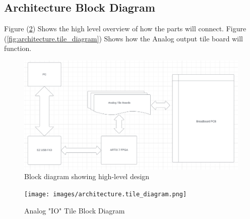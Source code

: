 \subsection{Architecture Block Diagram}
	Figure (\ref{fig:architecture.block_diagram}) Shows the high level overview of how the parts will connect. Figure (\ref{fig:architecture.tile_diagram}) Shows how the Analog output tile board will function.

	\begin{figure}[H]
		\centering
		\includegraphics[width=0.8\linewidth]{images/architecture.block_diagram.png}
		\caption{Block diagram showing high-level design}
		\label{fig:architecture.block_diagram}
		\vspace{15px}
	\end{figure}

	\begin{figure}[H]
		\centering
		\texttt{[image: images/architecture.tile\_diagram.png]}
		\caption{Analog "IO" Tile Block Diagram}
		\label{fig:architecture.block_diagram}
		\vspace{15px}
	\end{figure}